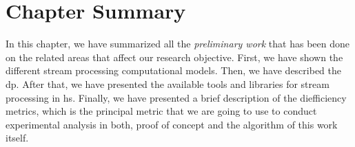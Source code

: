 \section{Chapter Summary}

In this chapter, we have summarized all the \emph{preliminary work} that has been done on the related areas that affect our research objective.
First, we have shown the different stream processing computational models. Then, we have described the \acrshort{dp}.  
After that, we have presented the available tools and libraries for stream processing in \acrshort{hs}.
Finally, we have presented a brief description of the diefficiency metrics, which is the principal metric that we are going to use to conduct experimental analysis in both, proof of concept and the algorithm of this work itself.
